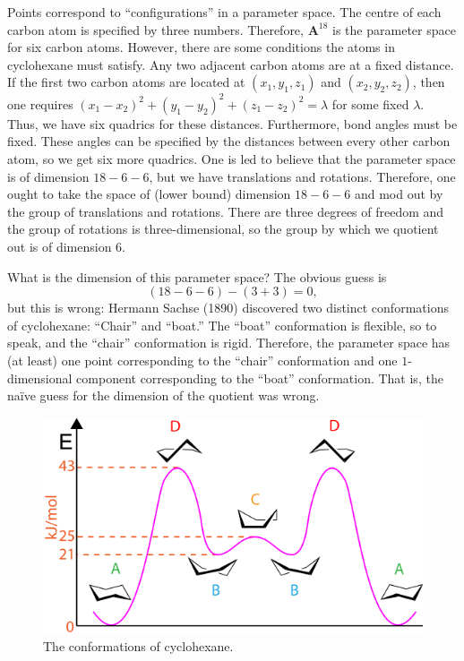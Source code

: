 \documentclass [11 pt, oneside] {article}
\begin{document}
\begin{example}\label{}
Points correspond to ``configurations'' in a parameter space. The centre of each carbon atom is specified by three numbers. Therefore, $\mathbf{A}^{18}$ is the parameter space for six carbon atoms. However, there are some conditions the atoms in cyclohexane must satisfy. Any two adjacent carbon atoms are at a fixed distance. If the first two carbon atoms are located at $(x_1,y_1,z_1)$ and $(x_2,y_2,z_2)$, then one requires $(x_1-x_2)^2 + (y_1-y_2)^2 + (z_1-z_2)^2=\lambda$ for some fixed $\lambda$. Thus, we have six quadrics for these distances. Furthermore, bond angles must be fixed. These angles can be specified by the distances between every other carbon atom, so we get six more quadrics. One is led to believe that the parameter space is of dimension $18-6-6$, but we have translations and rotations. Therefore, one ought to take the space of (lower bound) dimension $18-6-6$ and mod out by the group of translations and rotations. There are three degrees of freedom and the group of rotations is three-dimensional, so the group by which we quotient out is of dimension $6$. 

What is the dimension of this parameter space? The obvious guess is  
\[
	(18-6-6) - (3+3)=0,
\] 
but this is wrong: Hermann Sachse (1890) discovered two distinct conformations of cyclohexane: ``Chair'' and ``boat.'' The ``boat'' conformation is flexible, so to speak, and the ``chair'' conformation is rigid. Therefore, the parameter space has (at least) one point corresponding to the ``chair'' conformation and one $1$-dimensional component corresponding to the ``boat'' conformation. That is, the na\"ive guess for the dimension of the quotient was wrong.
\end{example}
\iffalse
\begin{figure}
	\begin{center}
		\includegraphics[scale=0.5]{images/cyclohexane_conformations}
		\caption{The conformations of cyclohexane.}
	\end{center}
\end{figure}
\end{document}
